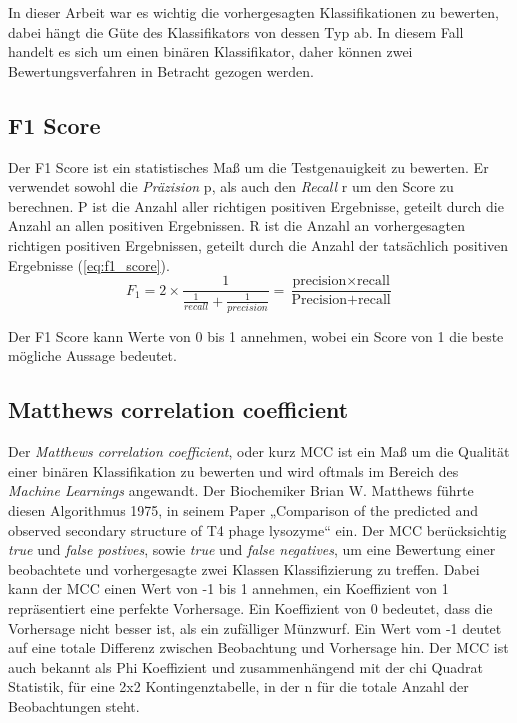 In dieser Arbeit war es wichtig die vorhergesagten Klassifikationen zu bewerten, dabei hängt die Güte des Klassifikators von dessen Typ ab. In diesem Fall handelt es sich um einen binären Klassifikator, daher können zwei Bewertungsverfahren in Betracht gezogen werden.

\subsection{F1 Score}
Der F1 Score ist ein statistisches Maß um die Testgenauigkeit zu bewerten. Er verwendet sowohl die \emph{Präzision} p, als auch den \emph{Recall} r um den Score zu berechnen. P ist die Anzahl aller richtigen positiven Ergebnisse, geteilt durch die Anzahl an allen positiven Ergebnissen. R ist die Anzahl an vorhergesagten richtigen positiven Ergebnissen, geteilt durch die Anzahl der tatsächlich positiven Ergebnisse (\ref{eq:f1_score}). 
\begin{equation}
    F_{1} = 2 \times \frac{1}{\frac{1}{recall}+\frac{1}{precision}} = \frac{\text{precision} \times \text{recall}}{\text{Precision} + \text{recall}}
    \label{eq:f1_score}
\end{equation}

Der F1 Score kann Werte von 0 bis 1 annehmen, wobei ein Score von 1 die beste mögliche Aussage bedeutet.


\subsection{Matthews correlation coefficient}

Der \emph{Matthews correlation coefficient}, oder kurz MCC ist ein Maß um die Qualität einer binären Klassifikation zu bewerten und wird oftmals im Bereich des \emph{Machine Learnings} angewandt. Der Biochemiker Brian W. Matthews führte diesen Algorithmus 1975, in seinem Paper „Comparison of the predicted and observed secondary structure of T4 phage lysozyme“\cite{Matthews.1975} ein. Der MCC berücksichtig \emph{true} und \emph{false postives}, sowie \emph{true} und \emph{false negatives}, um eine Bewertung einer beobachtete und vorhergesagte zwei Klassen Klassifizierung zu treffen. Dabei kann der MCC einen Wert von -1 bis 1 annehmen, ein Koeffizient von 1 repräsentiert eine perfekte Vorhersage. Ein Koeffizient von 0 bedeutet, dass die Vorhersage nicht besser ist, als ein zufälliger Münzwurf. Ein Wert vom -1 deutet auf eine totale Differenz zwischen Beobachtung und Vorhersage hin. Der MCC ist auch bekannt als Phi Koeffizient und zusammenhängend mit der chi Quadrat Statistik, für eine 2x2 Kontingenztabelle, in der n für die totale Anzahl der Beobachtungen steht.

